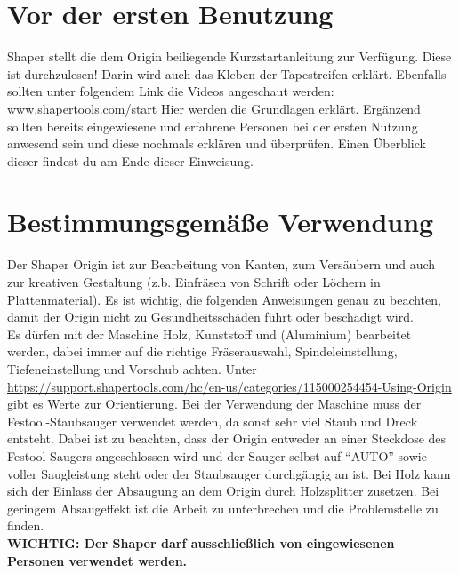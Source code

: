 \documentclass{\basedir/fablab-document}
\begin{document}


\section{Vor der ersten Benutzung}
Shaper stellt die dem Origin beiliegende Kurzstartanleitung zur Verfügung. Diese ist durchzulesen! Darin wird auch das Kleben der Tapestreifen erklärt.
Ebenfalls sollten unter folgendem Link die Videos angeschaut werden: \url{www.shapertools.com/start} Hier werden die Grundlagen erklärt. Ergänzend sollten bereits eingewiesene und erfahrene Personen bei der ersten Nutzung anwesend sein und diese nochmals erklären und überprüfen. Einen Überblick dieser findest du am Ende dieser Einweisung.

\section{Bestimmungsgemäße Verwendung}
Der Shaper Origin ist zur Bearbeitung von Kanten, zum Versäubern und auch zur kreativen Gestaltung (z.b. Einfräsen von Schrift oder Löchern in Plattenmaterial). Es ist wichtig, die folgenden Anweisungen genau zu beachten, damit der Origin nicht zu Gesundheitsschäden führt oder beschädigt wird.\\
Es dürfen mit der Maschine Holz, Kunststoff und (Aluminium) bearbeitet werden, dabei immer auf die richtige Fräserauswahl, Spindeleinstellung, Tiefeneinstellung und Vorschub achten. Unter \url{https://support.shapertools.com/hc/en-us/categories/115000254454-Using-Origin} gibt es Werte zur Orientierung. Bei der Verwendung der Maschine muss der Festool-Staubsauger verwendet werden, da sonst sehr viel Staub und Dreck entsteht. Dabei ist zu beachten, dass der Origin entweder an einer Steckdose des Festool-Saugers angeschlossen wird und der Sauger selbst auf \enquote{AUTO} sowie voller Saugleistung steht oder der Staubsauger durchgängig an ist. Bei Holz kann sich der Einlass der Absaugung an dem Origin durch Holzsplitter zusetzen. Bei geringem Absaugeffekt ist die Arbeit zu unterbrechen und die Problemstelle zu finden.\\
\textbf{WICHTIG: Der Shaper darf ausschließlich von eingewiesenen Personen verwendet werden.}
\end{document}
